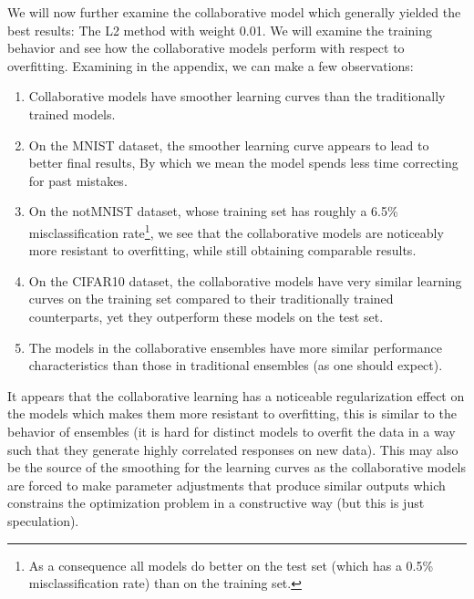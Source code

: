 \documentclass[english,a4paper,oneside]{amsart}
\theoremstyle{definition}
\begin{document}
We will now further examine the collaborative model which generally yielded the best results: The L2 method with weight 0.01. We will examine the training behavior and see how the collaborative models perform with respect to overfitting.  Examining  in the appendix, we can make a few observations:
\begin{enumerate}
	\item Collaborative models have smoother learning curves than the traditionally trained models.
	\item On the MNIST dataset, the smoother learning curve appears to lead to better final results, By which we mean the model spends less time correcting for past mistakes.
	\item On the notMNIST dataset, whose training set has roughly a 6.5\% misclassification rate\footnote{As a consequence all models do better on the test set (which has a 0.5\% misclassification rate) than on the training set.}, we see that the collaborative models are noticeably more resistant to overfitting, while still obtaining comparable results.
	\item On the CIFAR10 dataset, the collaborative models have very similar learning curves on the training set compared to their traditionally trained counterparts, yet they outperform these models on the test set.
	\item The models in the collaborative ensembles have more similar performance characteristics than those in traditional ensembles (as one should expect).
\end{enumerate}
It appears that the collaborative learning has a noticeable regularization effect on the models which makes them more resistant to overfitting, this is similar to the behavior of ensembles (it is hard for distinct models to overfit the data in a way such that they generate highly correlated responses on new data). This may also be the source of the smoothing for the learning curves as the collaborative models are forced to make parameter adjustments that produce similar outputs which constrains the optimization problem in a constructive way (but this is just speculation).
\end{document}
